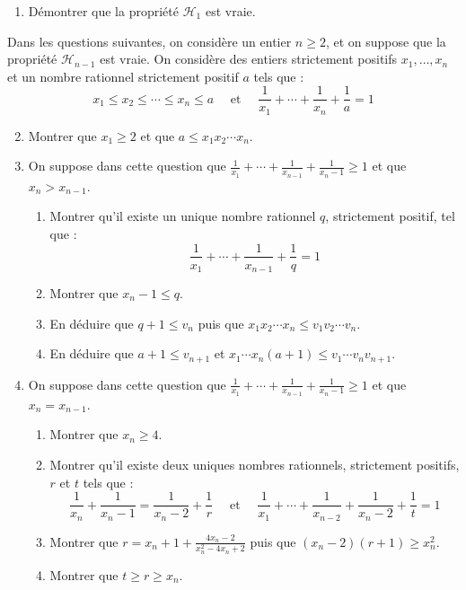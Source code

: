 \documentclass[landscape,twocolumn,leqno,a4paper,10pt]{report} %
\newcommand\n{\noindent}
\renewcommand{\geq}{\geqslant}
\renewcommand{\leq}{\leqslant}
\begin{document}
\begin{enumerate}
	\item Démontrer que la propriété $\mathscr{H}_{1}$ est vraie.
\end{enumerate}

\n Dans les questions suivantes, on considère un entier $n \geq 2$, et on suppose que la propriété $\mathscr{H}_{n-1}$ est vraie. On considère des entiers strictement positifs $x_{1}, \ldots, x_{n}$ et un nombre rationnel strictement positif $a$ tels que :
$$x_{1} \leq x_{2} \leq \cdots \leq x_{n} \leq a \quad \text { et } \quad \frac{1}{x_{1}}+\cdots+\frac{1}{x_{n}}+\frac{1}{a}=1$$

\begin{enumerate}\setcounter{enumi}{1}
	\item Montrer que $x_{1} \geq 2$ et que $a \leq x_{1} x_{2} \cdots x_{n}$.
	\item On suppose dans cette question que $\frac{1}{x_{1}}+\cdots+\frac{1}{x_{n-1}}+\frac{1}{x_{n}-1} \geq 1$ et que $x_{n}>x_{n-1}$.
	\begin{enumerate}
		\item Montrer qu'il existe un unique nombre rationnel $q$, strictement positif, tel que :
		$$\frac{1}{x_{1}}+\cdots+\frac{1}{x_{n-1}}+\frac{1}{q}=1$$
		\item Montrer que $x_{n}-1 \leq q$.
		\item En déduire que $q+1 \leq v_{n}$ puis que $x_{1} x_{2} \cdots x_{n} \leq v_{1} v_{2} \cdots v_{n}$.
		\item En déduire que $a+1 \leq v_{n+1}$ et $x_{1} \cdots x_{n}(a+1) \leq v_{1} \cdots v_{n} v_{n+1}$.
	\end{enumerate}
	\item On suppose dans cette question que $\frac{1}{x_{1}}+\cdots+\frac{1}{x_{n-1}}+\frac{1}{x_{n}-1} \geq 1$ et que $x_{n}=x_{n-1}$.
	\begin{enumerate}
		\item Montrer que $x_{n} \geq 4$.
		\item Montrer qu'il existe deux uniques nombres rationnels, strictement positifs, $r$ et $t$ tels que :
		$$\frac{1}{x_{n}}+\frac{1}{x_{n}-1}=\frac{1}{x_{n}-2}+\frac{1}{r} \quad \text { et } \quad \frac{1}{x_{1}}+\cdots+\frac{1}{x_{n-2}}+\frac{1}{x_{n}-2}+\frac{1}{t}=1$$
		\item Montrer que $r=x_{n}+1+\frac{4 x_{n}-2}{x_{n}^{2}-4 x_{n}+2}$ puis que $\left(x_{n}-2\right)(r+1) \geq x_{n}^{2}$.
		\item Montrer que $t \geq r \geq x_{n}$.

\end{enumerate}
\end{enumerate}
\end{document}
